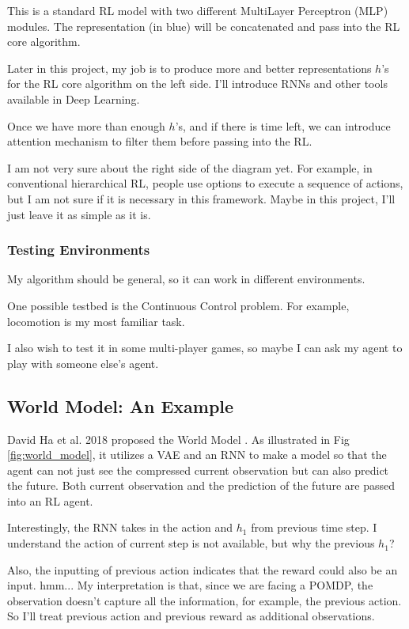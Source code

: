 This is a standard RL model with two different MultiLayer Perceptron (MLP) modules.
The representation (in blue) will be concatenated and pass into the RL core algorithm.

Later in this project, my job is to produce more and better representations $h$'s for the RL core algorithm on the left side.
I'll introduce RNNs and other tools available in Deep Learning.

Once we have more than enough $h$'s, and if there is time left,  we can introduce attention mechanism to filter them before passing into the RL.

I am not very sure about the right side of the diagram yet.
For example, in conventional hierarchical RL, people use options to execute a sequence of actions, but I am not sure if it is necessary in this framework.
Maybe in this project, I'll just leave it as simple as it is.

\subsubsection{Testing Environments}
My algorithm should be general, so it can work in different environments.

One possible testbed is the Continuous Control problem.
For example, locomotion is my most familiar task.

I also wish to test it in some multi-player games, so maybe I can ask my agent to play with someone else's agent.

\subsection{World Model: An Example}
David Ha et al. 2018 proposed the World Model \cite{ha_world_2018}.
As illustrated in Fig \ref{fig:world_model}, it utilizes a VAE and an RNN to make a model so that the agent can not just see the compressed current observation but can also predict the future.
Both current observation and the prediction of the future are passed into an RL agent.

Interestingly, the RNN takes in the action and $h_1$ from previous time step. I understand the action of current step is not available, but why the previous $h_1$?

Also, the inputting of previous action indicates that the reward could also be an input. hmm... My interpretation is that, since we are facing a POMDP, the observation doesn't capture all the information, for example, the previous action. So I'll treat previous action and previous reward as additional observations.

